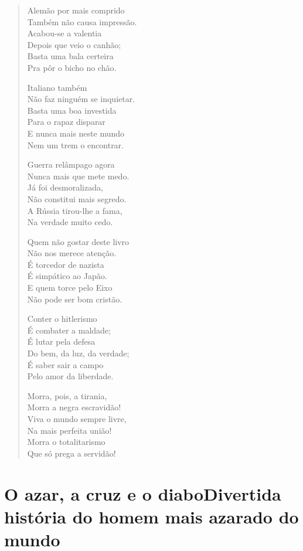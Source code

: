 \begin{verse}
Alemão por mais comprido\\
Também não causa impressão.\\
Acabou-se a valentia\\
Depois que veio o canhão;\\
Basta uma bala certeira\\
Pra pôr o bicho no chão.

Italiano também\\
Não faz ninguém se inquietar.\\
Basta uma boa investida\\
Para o rapaz disparar\\
E nunca mais neste mundo\\
Nem um trem o encontrar.

Guerra relâmpago agora\\
Nunca mais que mete medo.\\
Já foi desmoralizada,\\
Não constitui mais segredo.\\
A Rússia tirou-lhe a fama,\\
Na verdade muito cedo.
\pagebreak

Quem não gostar deste livro\\
Não nos merece atenção.\\
É torcedor de nazista\\
É simpático ao Japão.\\
E quem torce pelo Eixo\\
Não pode ser bom cristão.

Conter o hitlerismo\\
É combater a maldade;\\
É lutar pela defesa\\
Do bem, da luz, da verdade;\\
É saber sair a campo\\
Pelo amor da liberdade.

Morra, pois, a tirania,\\
Morra a negra escravidão! \\
Viva o mundo sempre livre,\\
Na mais perfeita união!\\
Morra o totalitarismo\\
Que só prega a servidão!
\end{verse}

\chapter[O azar, a cruz e o diabo\\ Divertida história do homem mais azarado do mundo]{O azar, a cruz e o diabo\break Divertida história do homem mais azarado do mundo}

